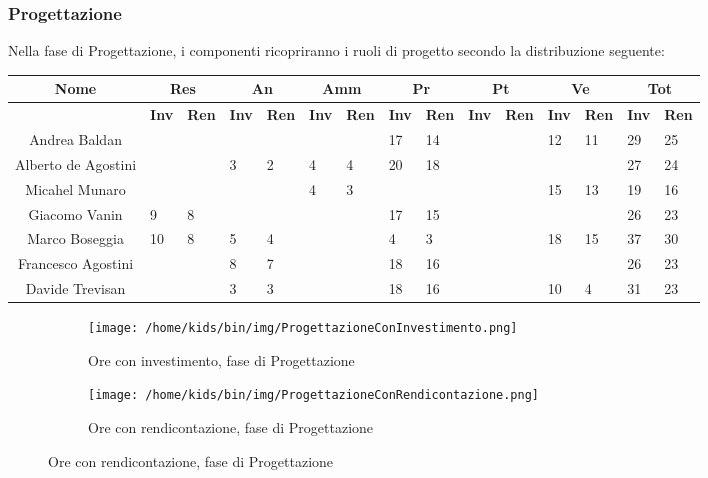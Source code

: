 \documentclass{scalatekids-article}
\begin{document}
\subsubsection{Progettazione}
Nella fase di Progettazione, i componenti ricopriranno i ruoli di progetto secondo la distribuzione seguente:
\begin{center}
  \scriptsize
  \begin{tabular}{| c | p{0.35cm}  p{0.35cm} | p{0.35cm}  p{0.35cm} | p{0.35cm}  p{0.35cm} | p{0.35cm}  p{0.35cm} | p{0.35cm}  p{0.35cm} | p{0.35cm}  p{0.35cm} | p{0.35cm}  p{0.35cm} |}
    \hline
    \textbf{Nome} & \multicolumn{2}{|c|}{\textbf{Res}} & \multicolumn{2}{|c|}{\textbf{An}} & \multicolumn{2}{|c|}{\textbf{Amm}} & \multicolumn{2}{|c|}{\textbf{Pr}} & \multicolumn{2}{|c|}{\textbf{Pt}} & \multicolumn{2}{|c|}{\textbf{Ve}} & \multicolumn{2}{|c|}{\textbf{Tot}}\\
    \hline
    & \textbf{Inv} & \textbf{Ren} & \textbf{Inv} & \textbf{Ren} & \textbf{Inv} & \textbf{Ren} & \textbf{Inv} & \textbf{Ren} & \textbf{Inv} & \textbf{Ren} & \textbf{Inv} & \textbf{Ren} & \textbf{Inv} & \textbf{Ren}\\
    \hline
    Andrea Baldan & & & & & & & 17 & 14 & & & 12 & 11 & 29 & 25\\
    Alberto de Agostini & & & 3 & 2 & 4 & 4 & 20 & 18 & & & & & 27 & 24\\
    Micahel Munaro & & & & & 4 & 3 & & & & & 15 & 13 & 19 & 16\\
    Giacomo Vanin & 9 & 8 & & & & & 17 & 15 & & & & & 26 & 23\\
    Marco Boseggia & 10 & 8 & 5 & 4 & & & 4 & 3 & & & 18 & 15 & 37 & 30\\
    Francesco Agostini & & & 8 & 7 & & & 18 & 16 & & & & & 26 & 23\\
    Davide Trevisan & & & 3 & 3 & & & 18 & 16 & & & 10 & 4 & 31 & 23\\
    \hline
  \end{tabular}
\end{center}
\begin{figure}[H]
  \begin{subfigure}[H]{0.47\textwidth}
    \texttt{[image: /home/kids/bin/img/ProgettazioneConInvestimento.png]}
    \caption{Ore con investimento, fase di Progettazione}
  \end{subfigure}
  \qquad
  \begin{subfigure}[H]{0.47\textwidth}
    \texttt{[image: /home/kids/bin/img/ProgettazioneConRendicontazione.png]}
    \caption{Ore con rendicontazione, fase di Progettazione}
  \end{subfigure}
\end{figure}
\end{document}
